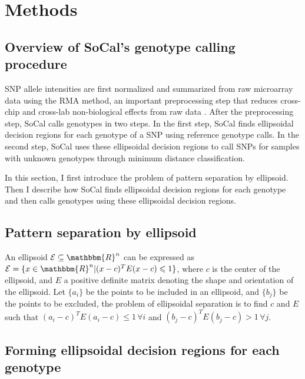 \documentclass{scrartcl}
\begin{document}
\section{Methods}

\subsection{Overview of SoCal's genotype calling procedure}

\par
SNP allele intensities are first normalized and summarized from raw microarray
data using the RMA method, an important preprocessing step that reduces
cross-chip and cross-lab non-biological effects from raw data
\cite{bolstad2003,carvalho2007}.
After the preprocessing step, SoCal calls genotypes in two steps.
In the first step, SoCal finds ellipsoidal decision regions for each genotype
of a SNP using reference genotype calls.
In the second step, SoCal uses these ellipsoidal decision regions to call SNPs
for samples with unknown genotypes through minimum distance classification.

\par
In this section, I first introduce the problem of pattern separation by
ellipsoid.
Then I describe how SoCal finds ellipsoidal decision regions for each
genotype and then calls genotypes using these ellipsoidal decision regions.

\subsection{Pattern separation by ellipsoid}

\par
An ellipsoid $\mathcal{E} \subseteq \mathbbm{R}^{n}$ can be expressed as
$\mathcal{E} = \{x \in \mathbbm{R}^{n} | (x-c)^TE(x-c)\leqslant1\}$, where
$c$ is the center of the ellipsoid, and $E$ a positive definite matrix
denoting the shape and orientation of the ellipsoid.
Let $\{a_i\}$ be the points to be included in an ellipsoid, and $\{b_j\}$
be the points to be excluded, the problem of ellipsoidal separation is to find
$c$ and $E$ such that $(a_i-c)^TE(a_i-c)\leqslant1 \, \forall i$ and
$(b_j-c)^TE(b_j-c)>1 \, \forall j$.

\subsection{Forming ellipsoidal decision regions for each genotype}
\end{document}
